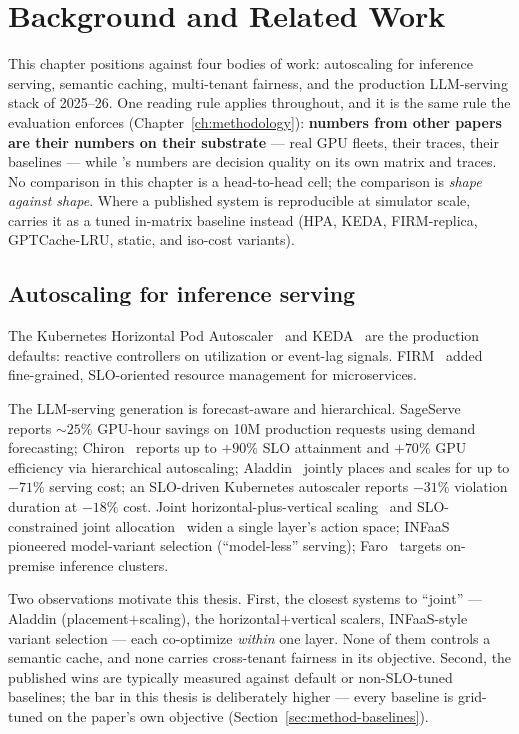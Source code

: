 \chapter{Background and Related Work}
\label{ch:background}

This chapter positions \polyforge{} against four bodies of work: autoscaling
for inference serving, semantic caching, multi-tenant fairness, and the
production LLM-serving stack of 2025--26. One reading rule applies
throughout, and it is the same rule the evaluation enforces
(Chapter~\ref{ch:methodology}): \textbf{numbers from other papers are their
numbers on their substrate} --- real GPU fleets, their traces, their
baselines --- while \polyforge{}'s numbers are decision quality on its own
matrix and traces. No comparison in this chapter is a head-to-head cell; the
comparison is \emph{shape against shape}. Where a published system is
reproducible at simulator scale, \polyforge{} carries it as a tuned in-matrix
baseline instead (HPA, KEDA, FIRM-replica, GPTCache-LRU, static, and iso-cost
variants).

\section{Autoscaling for inference serving}

The Kubernetes Horizontal Pod Autoscaler~\citep{k8shpa} and
KEDA~\citep{keda} are the production defaults: reactive controllers on
utilization or event-lag signals. FIRM~\citep{firm2020} added fine-grained,
SLO-oriented resource management for microservices.

The LLM-serving generation is forecast-aware and hierarchical.
SageServe~\citep{sageserve2025} reports ${\sim}25\%$ GPU-hour savings on 10M
production requests using demand forecasting; Chiron~\citep{chiron2025}
reports up to $+90\%$ SLO attainment and $+70\%$ GPU efficiency via
hierarchical autoscaling; Aladdin~\citep{aladdin2024} jointly places and
scales for up to $-71\%$ serving cost; an SLO-driven Kubernetes autoscaler
\citep{k8sslo2025} reports $-31\%$ violation duration at $-18\%$ cost.
Joint horizontal-plus-vertical scaling~\citep{taleoftwoscales2024} and
SLO-constrained joint allocation~\citep{jointalloc2026} widen a single
layer's action space; INFaaS~\citep{infaas2019} pioneered model-variant
selection (``model-less'' serving); Faro~\citep{faro2024} targets on-premise
inference clusters.

Two observations motivate this thesis. First, the closest systems to
``joint'' --- Aladdin (placement$+$scaling), the horizontal$+$vertical
scalers, INFaaS-style variant selection --- each co-optimize \emph{within}
one layer. None of them controls a semantic cache, and none carries
cross-tenant fairness in its objective. Second, the published wins are
typically measured against default or non-SLO-tuned baselines; the bar in
this thesis is deliberately higher --- every baseline is grid-tuned on the
paper's own objective (Section~\ref{sec:method-baselines}).

